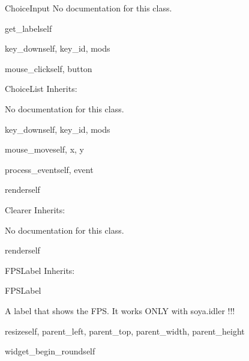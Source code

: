 \begin{classdesc*}{ChoiceInput}
No documentation for this class.

\begin{methoddesc}{get_label}{self}
\end{methoddesc}

\begin{methoddesc}{key_down}{self, key_id, mods}
\end{methoddesc}

\begin{methoddesc}{mouse_click}{self, button}
\end{methoddesc}

\end{classdesc*}

\begin{classdesc*}{ChoiceList}
Inherits:

No documentation for this class.

\begin{methoddesc}{key_down}{self, key_id, mods}
\end{methoddesc}

\begin{methoddesc}{mouse_move}{self, x, y}
\end{methoddesc}

\begin{methoddesc}{process_event}{self, event}
\end{methoddesc}

\begin{methoddesc}{render}{self}
\end{methoddesc}

\end{classdesc*}

\begin{classdesc*}{Clearer}
Inherits:

No documentation for this class.

\begin{methoddesc}{render}{self}
\end{methoddesc}

\end{classdesc*}

\begin{classdesc*}{FPSLabel}
Inherits:

FPSLabel

A label that shows the FPS.
It works ONLY with soya.idler !!!

\begin{methoddesc}{resize}{self, parent_left, parent_top, parent_width, parent_height}
\end{methoddesc}

\begin{methoddesc}{widget_begin_round}{self}
\end{methoddesc}

\end{classdesc*}

